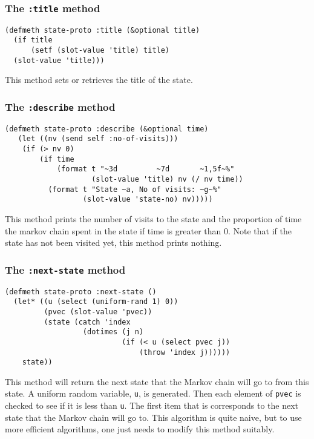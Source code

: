 \subsubsection{The {\tt :title} method}
\label{subsubsec:states-title}
\begin{verbatim}
(defmeth state-proto :title (&optional title)
  (if title 
      (setf (slot-value 'title) title)
  (slot-value 'title)))
\end{verbatim}
This method sets or retrieves the title of the state.


\subsubsection{The {\tt :describe} method}
\label{subsubsec:states-describe}
\begin{verbatim}
(defmeth state-proto :describe (&optional time)
   (let ((nv (send self :no-of-visits)))
    (if (> nv 0)
        (if time
            (format t "~3d         ~7d       ~1,5f~%"
                    (slot-value 'title) nv (/ nv time))
          (format t "State ~a, No of visits: ~g~%" 
                  (slot-value 'state-no) nv)))))
 \end{verbatim}
This method prints the number of visits to the state and the
proportion of time the markov chain spent in the state if time is
greater than 0.  Note that if the state has not been visited yet, this
method prints nothing.


\subsubsection{The {\tt :next-state} method}
\label{subsubsec:next-state}
\begin{verbatim}
(defmeth state-proto :next-state ()
  (let* ((u (select (uniform-rand 1) 0))
         (pvec (slot-value 'pvec))
         (state (catch 'index
                  (dotimes (j n)
                           (if (< u (select pvec j))
                               (throw 'index j))))))
    state))
\end{verbatim}
This method will return the next state that the Markov chain will go to from
this state.  A uniform random variable, {\tt u}, is generated.  Then each
element of {\tt pvec} is checked to see if it is less than {\tt u}.  
The first item that is corresponds to the next state that the Markov chain 
will go to.  This algorithm is quite naive, but to use more efficient
algorithms, one just needs to modify this method suitably. 
